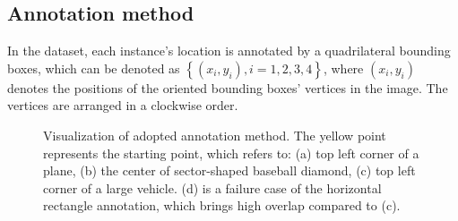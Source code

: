 \documentclass[a4paper]{article}
\begin{document}
\subsection{Annotation method}
In the dataset, each instance's location is annotated by a quadrilateral bounding boxes, which can be denoted as \(\left \{ (x_i,y_i), i=1,2,3,4 \right \}\), where $(x_i, y_i)$ denotes the positions of the oriented bounding boxes' vertices in the image. The vertices are arranged in a clockwise order.
\begin{figure}[htb!]
\centering
\vspace{-3mm}
\caption{Visualization of adopted annotation method. The yellow point represents the starting point, which refers to:  (a) top left corner of a plane, (b) the center of sector-shaped baseball diamond, (c) top left corner of a large vehicle. (d) is a failure case of the horizontal rectangle annotation, which brings high overlap compared to (c).}
\label{fig:labeing-way}
\end{figure}
\end{document}
